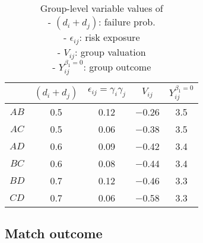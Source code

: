 \begin{table}[htbp!]
  \begin{center}
    \begin{minipage}[c]{0.3\linewidth}
\centering %
      \caption{Group-level variable values of\\ - $(d_i+d_j)$: failure prob. \\ - $\epsilon_{ij}$: risk exposure \\ - $V_{ij}$: group valuation \\ - $Y^{\beta_1=0}_{ij}$: group outcome} \label{Tab:BiasExampleSimple2}
    \end{minipage}
    \begin{minipage}[c]{0.6\linewidth}
\centering
\small
\begin{tabular}{c||cccc}
& $(d_{i}+d_j)$ & $\epsilon_{ij}=\gamma_i\gamma_j$ & $V_{ij}$ & $Y^{\beta_1=0}_{ij}$ \\
\hline\hline
\multicolumn{1}{|c||}{$AB$}& 0.5 & 0.12 & $-$0.26 & \multicolumn{1}{c|}{3.5} \\
\hline
\multicolumn{1}{c||}{$AC$} & 0.5 & 0.06 & $-$0.38 & 3.5 \\
\multicolumn{1}{c||}{$AD$} & 0.6 & 0.09 & $-$0.42 & 3.4 \\
\multicolumn{1}{c||}{$BC$} & 0.6 & 0.08 & $-$0.44 & 3.4 \\
\multicolumn{1}{c||}{$BD$} & 0.7 & 0.12 & $-$0.46 & 3.3 \\
\hline
\multicolumn{1}{|c||}{$CD$}& 0.7 & 0.06 & $-$0.58 & \multicolumn{1}{c|}{3.3} \\
\hline\hline
\end{tabular}
    \end{minipage}
  \end{center}
\end{table}



\subsection{Match outcome}

